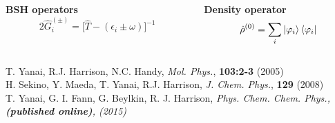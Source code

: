 \begin{frame}
\vspace{7mm}

\begin{columns}
\begin{column}[b]{0.48\linewidth}
\centering
\textbf{BSH operators} 
\begin{equation}
    \nonumber
    2\hat{G}_i^{(\pm)} = \Big[\hat{T} - (\epsilon_i \pm \omega)\Big]^{-1} 
\end{equation}
\end{column}

\begin{column}[b]{0.48\linewidth}
\centering
\textbf{Density operator}
\begin{equation}
    \nonumber
    \hat{\rho}^{(0)} = \sum_i \ket{\varphi_i}\bra{\varphi_i}
\end{equation}
\end{column}
\end{columns}

\vspace{5mm}
\centering
\tiny
T. Yanai, R.J. Harrison, N.C. Handy,
{\it Mol. Phys.},
\textbf{103:2-3} 
(2005)\\
H. Sekino, Y. Maeda, T. Yanai, R.J. Harrison,
{\it J. Chem. Phys.},
\textbf{129} 
(2008)\\
T. Yanai, G. I. Fann, G. Beylkin, R. J. Harrison,
\it{Phys. Chem. Chem. Phys.}, 
\textbf{(published online)},
(2015)

\end{frame}

